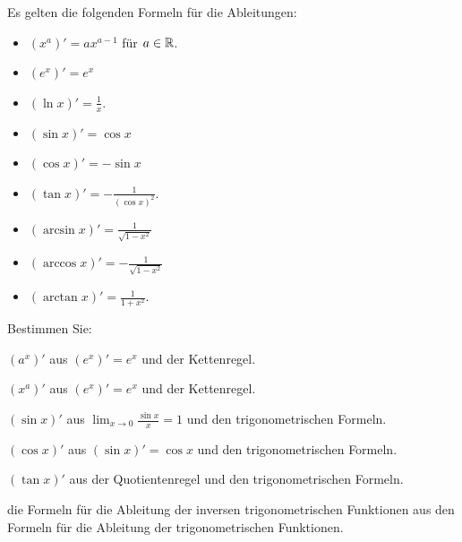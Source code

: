 


\begin{thm} Es gelten die folgenden Formeln für die Ableitungen: 
	\begin{itemize}
		\item[] $(x^a)' = a x^{a-1}$ für $a \in \mathbb{R}$. 
		\item[] $(e^x)'  = e^x$
		\item[] $(\ln x)' = \frac{1}{x}$. 
		\item[] $(\sin x)' = \cos x$
		\item[] $(\cos x)' = - \sin x$
		\item[] $(\tan x)' = - \frac{1}{(\cos x)^2}$. 
		\item[] $(\arcsin x)' = \frac{1}{\sqrt{1-x^2}}$
		\item[] $(\arccos x)' = - \frac{1}{\sqrt{1-x^2}}$
		\item[] $(\arctan x)' = \frac{1}{1+x^2}$. 
	\end{itemize} 
\end{thm} 

	\begin{aufg} 
		Bestimmen Sie: 
		\begin{enuma}
			\item $(a^x)'$ aus $(e^x)' = e^x$ und der Kettenregel. 
			\item $(x^a)'$ aus $(e^x)' = e^x$ und der Kettenregel. 
			\item $(\sin x)'$ aus $\lim_{x \to 0} \frac{\sin x}{x} = 1$ und den trigonometrischen Formeln. 
			\item $(\cos x)'$ aus $(\sin x)' = \cos x$ und den trigonometrischen Formeln. 
			\item $(\tan x)'$ aus der Quotientenregel und den trigonometrischen Formeln.
			\item die Formeln für die Ableitung der inversen trigonometrischen Funktionen aus den Formeln für die Ableitung der trigonometrischen Funktionen. 
		\end{enuma} 
	\end{aufg} 


